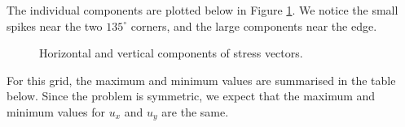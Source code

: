 \documentclass{article}
\numberwithin{equation}{section}
\theoremstyle{definition}
\begin{document}
The individual components are plotted below in Figure \ref{fig:fig7}. We notice the small spikes near the two $135^{\circ} $ corners, and the large components near the edge.

\begin{figure}[H]
    \centering
    \hfill

    \hfill
    \caption{Horizontal and vertical components of stress vectors.}
    \label{fig:fig7}
\end{figure}
For this grid, the maximum and minimum values are summarised in the table below. Since the problem is symmetric, we expect that the maximum and minimum values for $u_x$ and $u_y$ are the same.
\end{document}
